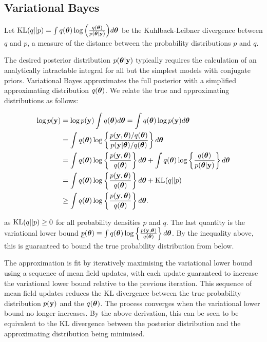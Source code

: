 \documentclass{amsart}[12pt]
\begin{document}
\subsection{Variational Bayes}

Let $\text{KL}(q||p) = \int q({\boldsymbol \theta}) \log{\left( \frac{q({\boldsymbol\theta})}{p({\boldsymbol\theta}|{\bf y})} \right)} d {\boldsymbol \theta}$ be the
Kuhlback-Leibner divergence between $q$ and $p$, a measure of the distance between the probability
distributions $p$ and $q$.

The desired posterior distribution $p({\boldsymbol \theta} | {\bf y})$ typically requires the calculation of an analytically
intractable integral for all but the simplest models with conjugate priors. Variational Bayes approximates the
full posterior with a simplified approximating distribution $q({\boldsymbol \theta})$. We relate the true and
approximating distributions as follows:

\begin{align*}
	\log p({\bf y}) & = \log p({\bf y}) \int q({\boldsymbol \theta}) d {\boldsymbol \theta} = \int q({\boldsymbol \theta}) \log p({\bf y}) d {\boldsymbol \theta}                                    \\
	            & = \int q({\boldsymbol \theta}) \log \left\{ \frac{p({\bf y}, {\boldsymbol \theta}) / q({\boldsymbol \theta})}{p({\bf y}|{\boldsymbol \theta}) / q({\boldsymbol \theta})} \right\} d {\boldsymbol \theta} \\
	            & = \int q({\boldsymbol \theta}) \log\left\{ \frac{p({\bf y}, {\boldsymbol \theta})}{q({\boldsymbol \theta})} \right\} d {\boldsymbol \theta} +                              
	\int q({\boldsymbol \theta}) \log\left\{ \frac{q({\boldsymbol \theta})}{p({\boldsymbol \theta}|{\bf y})} \right\} d {\boldsymbol \theta} \\
	            & = \int q({\boldsymbol \theta}) \log\left\{ \frac{p({\bf y}, {\boldsymbol \theta})}{q({\boldsymbol \theta})} \right\} d {\boldsymbol \theta} +                              
	\text{KL}(q||p) \\
	            & \geq \int q({\boldsymbol \theta}) \log\left\{ \frac{p({\bf y}, {\boldsymbol \theta})}{q({\boldsymbol \theta})} \right\} d {\boldsymbol \theta}.                            
\end{align*}

as $\text{KL}(q||p) \geq 0$ for all probability densities $p$ and $q$. The last quantity is the variational lower
bound $\underline{p}({\boldsymbol \theta}) \equiv \int q({\boldsymbol \theta}) \log\left\{ \frac{p({\bf y}, {\boldsymbol \theta})}{q({\boldsymbol \theta})} \right\}
d{\boldsymbol \theta}$. By the inequality above, this is guaranteed to bound the true probability distribution from below.

The approximation is fit by iteratively maximising the variational lower bound using a sequence of mean field
updates, with each update guaranteed to increase the variational lower bound relative to the previous
iteration. This sequence of mean field updates reduces the KL divergence between the true probability
distribution $p({\bf y})$ and the $q({\boldsymbol \theta})$. The process converges when the variational lower bound no longer
increases. By the above derivation, this can be seen to be equivalent to the KL divergence between the posterior distribution and the approximating distribution being minimised.
\end{document}
